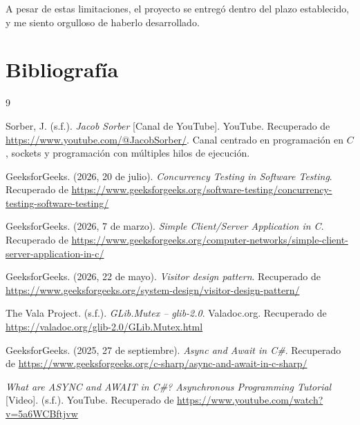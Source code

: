 \documentclass{article}
\begin{document}
    A pesar de estas limitaciones, el proyecto se entregó dentro del plazo establecido, y me siento orgulloso de haberlo desarrollado.

    \section{Bibliografía}
\begin{thebibliography}{9}
 
Sorber, J. (s.f.). \textit{Jacob Sorber} [Canal de YouTube]. YouTube. Recuperado de \url{https://www.youtube.com/@JacobSorber/}. Canal centrado en programación en $C$, sockets y programación con múltiples hilos de ejecución.
 
GeeksforGeeks. (2026, 20 de julio). \textit{Concurrency Testing in Software Testing}. Recuperado de \url{https://www.geeksforgeeks.org/software-testing/concurrency-testing-software-testing/}
 
GeeksforGeeks. (2026, 7 de marzo). \textit{Simple Client/Server Application in C}. Recuperado de \url{https://www.geeksforgeeks.org/computer-networks/simple-client-server-application-in-c/}
 
GeeksforGeeks. (2026, 22 de mayo). \textit{Visitor design pattern}. Recuperado de \url{https://www.geeksforgeeks.org/system-design/visitor-design-pattern/}
 
The Vala Project. (s.f.). \textit{GLib.Mutex -- glib-2.0}. Valadoc.org. Recuperado de \url{https://valadoc.org/glib-2.0/GLib.Mutex.html}
 
GeeksforGeeks. (2025, 27 de septiembre). \textit{Async and Await in C\#}. Recuperado de \url{https://www.geeksforgeeks.org/c-sharp/async-and-await-in-c-sharp/}
 
\textit{What are ASYNC and AWAIT in C\#? Asynchronous Programming Tutorial} [Video]. (s.f.). YouTube. Recuperado de \url{https://www.youtube.com/watch?v=5a6WCBftjvw}
 
\end{thebibliography}
\end{document}
